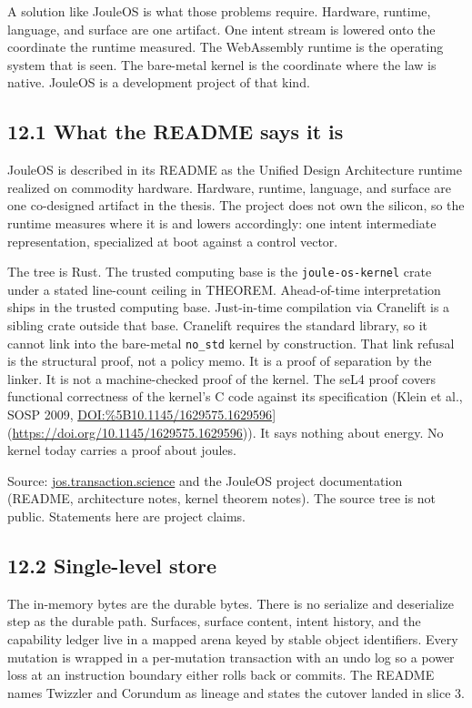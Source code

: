 \documentclass[10pt,letterpaper]{article}
\begin{document}
A solution like JouleOS is what those problems require. Hardware,
runtime, language, and surface are one artifact. One intent stream is
lowered onto the coordinate the runtime measured. The WebAssembly
runtime is the operating system that is seen. The bare-metal kernel is
the coordinate where the law is native. JouleOS is a development project
of that kind.

\subsection{12.1 What the README says it
is}\label{what-the-readme-says-it-is}

JouleOS is described in its README as the Unified Design Architecture
runtime realized on commodity hardware. Hardware, runtime, language, and
surface are one co-designed artifact in the thesis. The project does not
own the silicon, so the runtime measures where it is and lowers
accordingly: one intent intermediate representation, specialized at boot
against a control vector.

The tree is Rust. The trusted computing base is the
\texttt{joule-os-kernel} crate under a stated line-count ceiling in
THEOREM. Ahead-of-time interpretation ships in the trusted computing
base. Just-in-time compilation via Cranelift is a sibling crate outside
that base. Cranelift requires the standard library, so it cannot link
into the bare-metal \texttt{no\_std} kernel by construction. That link
refusal is the structural proof, not a policy memo. It is a proof of
separation by the linker. It is not a machine-checked proof of the
kernel. The seL4 proof covers functional correctness of the kernel's C
code against its specification (Klein et al., SOSP 2009,
\url{DOI:\%5B10.1145/1629575.1629596}{]}(\url{https://doi.org/10.1145/1629575.1629596})).
It says nothing about energy. No kernel today carries a proof about
joules.

Source: \href{https://jos.transaction.science/}{jos.transaction.science}
and the JouleOS project documentation (README, architecture notes,
kernel theorem notes). The source tree is not public. Statements here
are project claims.

\subsection{12.2 Single-level store}\label{single-level-store}

The in-memory bytes are the durable bytes. There is no serialize and
deserialize step as the durable path. Surfaces, surface content, intent
history, and the capability ledger live in a mapped arena keyed by
stable object identifiers. Every mutation is wrapped in a per-mutation
transaction with an undo log so a power loss at an instruction boundary
either rolls back or commits. The README names Twizzler and Corundum as
lineage and states the cutover landed in slice 3.
\end{document}
